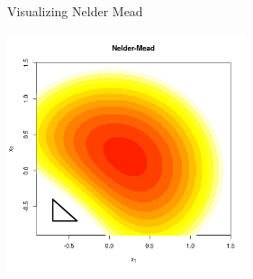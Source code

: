 \documentclass[10pt]{beamer}
\begin{document}
\begin{frame}{Visualizing Nelder Mead}
  \begin{center}
    \includegraphics[height=7cm]{RCode/NM/out/out00}
  \end{center}
\end{frame}
\end{document}
